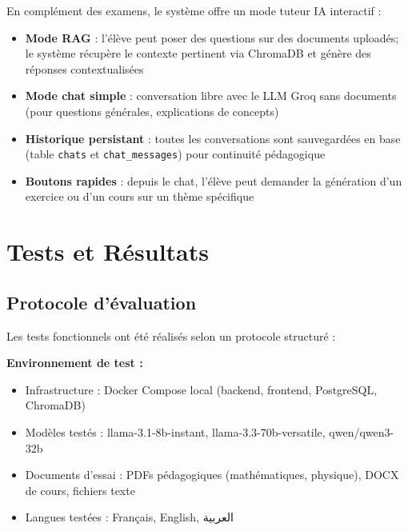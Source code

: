 En complément des examens, le système offre un mode tuteur IA interactif :
\begin{itemize}
    \item \textbf{Mode RAG} : l'élève peut poser des questions sur des documents uploadés; le système récupère le contexte pertinent via ChromaDB et génère des réponses contextualisées
    \item \textbf{Mode chat simple} : conversation libre avec le LLM Groq sans documents (pour questions générales, explications de concepts)
    \item \textbf{Historique persistant} : toutes les conversations sont sauvegardées en base (table \texttt{chats} et \texttt{chat\_messages}) pour continuité pédagogique
    \item \textbf{Boutons rapides} : depuis le chat, l'élève peut demander la génération d'un exercice ou d'un cours sur un thème spécifique
\end{itemize}

\section{Tests et Résultats}

\subsection{Protocole d'évaluation}

Les tests fonctionnels ont été réalisés selon un protocole structuré :

\textbf{Environnement de test :}
\begin{itemize}
    \item Infrastructure : Docker Compose local (backend, frontend, PostgreSQL, ChromaDB)
    \item Modèles testés : llama-3.1-8b-instant, llama-3.3-70b-versatile, qwen/qwen3-32b
    \item Documents d'essai : PDFs pédagogiques (mathématiques, physique), DOCX de cours, fichiers texte
    \item Langues testées : Français, English, العربية
\end{itemize}

